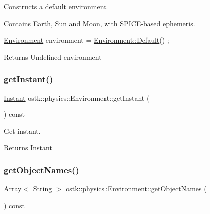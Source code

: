 Constructs a default environment. 

Contains Earth, Sun and Moon, with S\+P\+I\+C\+E-\/based ephemeris.


\begin{DoxyCode}
\hyperlink{classostk_1_1physics_1_1_environment_a9c721c6c5eba3608b2225922ab498c95}{Environment} environment = \hyperlink{classostk_1_1physics_1_1_environment_af713ff358f251bedc1c837e3efac59a4}{Environment::Default}() ;
\end{DoxyCode}


\begin{DoxyReturn}{Returns}
Undefined environment 
\end{DoxyReturn}
\mbox{\label{classostk_1_1physics_1_1_environment_a13c55249f309570bb9559191435c4a39}} 
\subsubsection{\texorpdfstring{get\+Instant()}{getInstant()}}
{\footnotesize\ttfamily \hyperlink{classostk_1_1physics_1_1time_1_1_instant}{Instant} ostk\+::physics\+::\+Environment\+::get\+Instant (\begin{DoxyParamCaption}{ }\end{DoxyParamCaption}) const}



Get instant. 

\begin{DoxyReturn}{Returns}
Instant 
\end{DoxyReturn}
\mbox{\label{classostk_1_1physics_1_1_environment_aaa1e5f8c43b809d9b0d91ecf58c549b5}} 
\subsubsection{\texorpdfstring{get\+Object\+Names()}{getObjectNames()}}
{\footnotesize\ttfamily Array$<$ String $>$ ostk\+::physics\+::\+Environment\+::get\+Object\+Names (\begin{DoxyParamCaption}{ }\end{DoxyParamCaption}) const}



